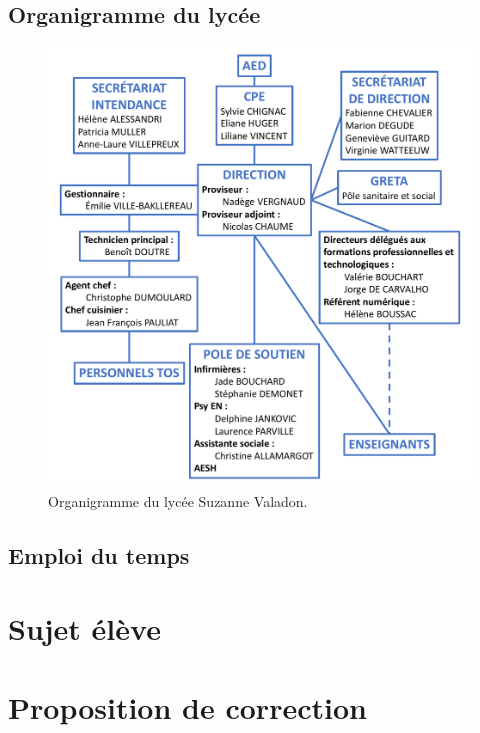 \documentclass[12pt,a4paper, fleqn]{report}
\begin{document}
\section{Organigramme du lycée}
\label{ann:organigramme}

\begin{figure}[h]
\center
\includegraphics[width=\textwidth]{../../s3/rapport/organigramme.pdf}
\caption{Organigramme du lycée Suzanne Valadon.}
\label{fig:organigramme}
\end{figure}

\section{Emploi du temps}
\label{ann:edt}



\chapter{Sujet élève}
\label{ann:sujet}



\chapter{Proposition de correction}
\label{ann:corr}
\end{document}
